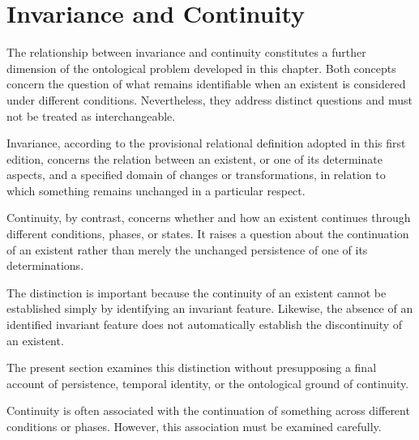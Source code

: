 

\section{Invariance and Continuity}
\label{sec:invariance-and-continuity}


The relationship between invariance and continuity
constitutes a further dimension of the ontological
problem developed in this chapter. Both concepts
concern the question of what remains identifiable
when an existent is considered under different
conditions. Nevertheless, they address distinct
questions and must not be treated as interchangeable.

Invariance, according to the provisional relational
definition adopted in this first edition, concerns
the relation between an existent, or one of its
determinate aspects, and a specified domain of
changes or transformations, in relation to which
something remains unchanged in a particular respect.

Continuity, by contrast, concerns whether and how
an existent continues through different conditions,
phases, or states. It raises a question about the
continuation of an existent rather than merely
the unchanged persistence of one of its determinations.

The distinction is important because the continuity
of an existent cannot be established simply by
identifying an invariant feature. Likewise, the
absence of an identified invariant feature does
not automatically establish the discontinuity
of an existent.

The present section examines this distinction
without presupposing a final account of persistence,
temporal identity, or the ontological ground of
continuity.


Continuity is often associated with the continuation
of something across different conditions or phases.
However, this association must be examined carefully.

